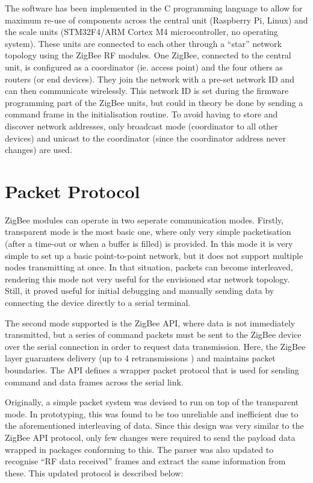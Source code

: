 The software has been implemented in the C programming language to allow for maximum re-use of components across the central unit (Raspberry Pi, Linux) and the scale units (STM32F4/ARM Cortex M4 microcontroller, no operating system). These units are connected to each other through a ``star'' network topology using the ZigBee RF modules. One ZigBee, connected to the central unit, is configured as a coordinator (ie. access point) and the four others as routers (or end devices). They join the network with a pre-set network ID and can then communicate wirelessly. This network ID is set during the firmware programming part of the ZigBee units, but could in theory be done by sending a command frame in the initialisation routine. To avoid having to store and discover network addresses, only broadcast mode (coordinator to all other devices) and unicast to the coordinator (since the coordinator address never changes) are used.

\section{Packet Protocol}
\label{section:software-impl-packets}
ZigBee modules can operate in two seperate communication modes. Firstly, transparent mode is the most basic one, where only very simple packetisation (after a time-out or when a buffer is filled) is provided. In this mode it is very simple to set up a basic point-to-point network, but it does not support multiple nodes transmitting at once. In that situation, packets can become interleaved, rendering this mode not very useful for the envisioned star network topology. Still, it proved useful for initial debugging and manually sending data by connecting the device directly to a serial terminal.

The second mode supported is the ZigBee API, where data is not immediately transmitted, but a series of command packets must be sent to the ZigBee device over the serial connection in order to request data transmission. Here, the ZigBee layer guarantees delivery (up to 4 retransmissions \cite[page 19]{xbee-datasheet}) and maintains packet boundaries. The API defines a wrapper packet protocol that is used for sending command and data frames across the serial link\cite[page 35 ff]{xbee-datasheet}.

Originally, a simple packet system was devised to run on top of the transparent mode. In prototyping, this was found to be too unreliable and inefficient due to the aforementioned interleaving of data. Since this design was very similar to the ZigBee API protocol, only few changes were required to send the payload data wrapped in packages conforming to this. The parser was also updated to recognise ``RF data received'' frames and extract the same information from these. This updated protocol is described below:

